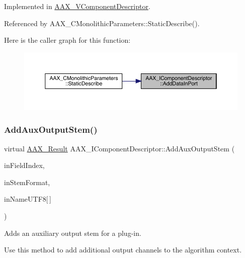Implemented in \mbox{\hyperlink{a01901_a1b2c3ae4de896e0f47a771ad8b1b5d08}{A\+A\+X\+\_\+\+V\+Component\+Descriptor}}.



Referenced by A\+A\+X\+\_\+\+C\+Monolithic\+Parameters\+::\+Static\+Describe().

Here is the caller graph for this function\+:
\nopagebreak
\begin{figure}[H]
\begin{center}
\leavevmode
\includegraphics[width=350pt]{a01781_a230293b9f6bb413626cd487ca501df75_icgraph}
\end{center}
\end{figure}
\mbox{\label{a01781_a76266e8a07ce20cdbe5721172c32a93d}} 
\subsubsection{\texorpdfstring{AddAuxOutputStem()}{AddAuxOutputStem()}}
{\footnotesize\ttfamily virtual \mbox{\hyperlink{a00392_a4d8f69a697df7f70c3a8e9b8ee130d2f}{A\+A\+X\+\_\+\+Result}} A\+A\+X\+\_\+\+I\+Component\+Descriptor\+::\+Add\+Aux\+Output\+Stem (\begin{DoxyParamCaption}\item[{\mbox{\hyperlink{a00392_ae807f8986143820cfb5d6da32165c9c7}{A\+A\+X\+\_\+\+C\+Field\+Index}}}]{in\+Field\+Index,  }\item[{int32\+\_\+t}]{in\+Stem\+Format,  }\item[{const char}]{in\+Name\+U\+T\+F8\mbox{[}$\,$\mbox{]} }\end{DoxyParamCaption})\hspace{0.3cm}{\ttfamily [pure virtual]}}



Adds an auxiliary output stem for a plug-\/in. 

Use this method to add additional output channels to the algorithm context.

